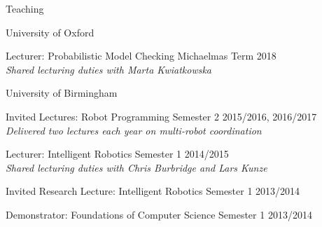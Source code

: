 
\begin{rSection}{Teaching}

\begin{rSubsection}{University of Oxford}{}{}{}
\item Lecturer: Probabilistic Model Checking  \hfill Michaelmas Term 2018\\
\textit{Shared lecturing duties with Marta Kwiatkowska}
\end{rSubsection}

\begin{rSubsection}{University of Birmingham}{}{}{}
\item Invited Lectures: Robot Programming  \hfill Semester 2 2015/2016, 2016/2017\\
\textit{Delivered two lectures each year on multi-robot coordination}
\item Lecturer: Intelligent Robotics \hfill Semester 1 2014/2015\\
\textit{Shared lecturing duties with Chris Burbridge and Lars Kunze}
\item Invited Research Lecture: Intelligent Robotics \hfill Semester 1 2013/2014
\item Demonstrator: Foundations of Computer Science \hfill Semester 1 2013/2014
\end{rSubsection}



\end{rSection}
